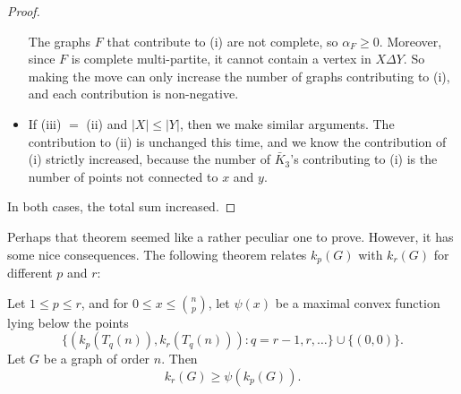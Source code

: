 \documentclass[a4paper]{article}
\begin{document}
\begin{proof}
\begin{itemize}
      The graphs $F$ that contribute to (i) are not complete, so $\alpha_F \geq 0$. Moreover, since $F$ is complete multi-partite, it cannot contain a vertex in $X \Delta Y$. So making the move can only increase the number of graphs contributing to (i), and each contribution is non-negative.
    \item If (iii) $=$ (ii) and $|X| \leq |Y|$, then we make similar arguments. The contribution to (ii) is unchanged this time, and we know the contribution of (i) strictly increased, because the number of $\bar{K}_3$'s contributing to (i) is the number of points not connected to $x$ and $y$.
  \end{itemize}
  In both cases, the total sum increased.
%
%
%
%
%
\end{proof}
Perhaps that theorem seemed like a rather peculiar one to prove. However, it has some nice consequences. The following theorem relates $k_p(G)$ with $k_r(G)$ for different $p$ and $r$:

\begin{thm}[Bollob\'as, 1976]
  Let $1 \leq p \leq r$, and for $0 \leq x \leq \binom{n}{p}$, let $\psi(x)$ be a maximal convex function lying below the points
  \[
    \{(k_p(T_q(n)), k_r(T_q(n))): q = r - 1, r, \ldots\} \cup \{(0, 0)\}.
  \]
  Let $G$ be a graph of order $n$. Then
  \[
    k_r(G) \geq \psi(k_p(G)).
  \]
\end{thm}
\end{document}
